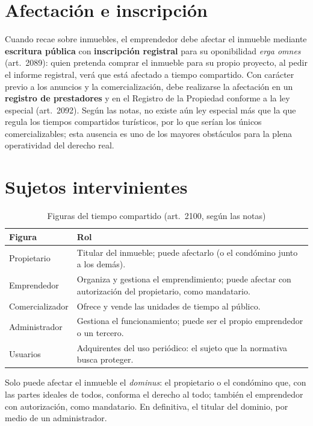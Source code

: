 \documentclass[12pt,oneside]{book}
\begin{document}
\section{Afectación e inscripción}

Cuando recae sobre inmuebles, el emprendedor debe afectar el inmueble mediante \textbf{escritura pública} con \textbf{inscripción registral} para su oponibilidad \textit{erga omnes} (art.~2089): quien pretenda comprar el inmueble para su propio proyecto, al pedir el informe registral, verá que está afectado a tiempo compartido. Con carácter previo a los anuncios y la comercialización, debe realizarse la afectación en un \textbf{registro de prestadores} y en el Registro de la Propiedad conforme a la ley especial (art.~2092). Según las notas, no existe aún ley especial más que la que regula los tiempos compartidos turísticos, por lo que serían los únicos comercializables; esta ausencia es uno de los mayores obstáculos para la plena operatividad del derecho real.

\section{Sujetos intervinientes}

\begin{table}[H]
\centering
\small
\begin{tabularx}{\textwidth}{>{\raggedright\arraybackslash}p{}>{\raggedright\arraybackslash}X}
\toprule
\textbf{Figura} & \textbf{Rol} \\
\midrule
Propietario & Titular del inmueble; puede afectarlo (o el condómino junto a los demás). \\
Emprendedor & Organiza y gestiona el emprendimiento; puede afectar con autorización del propietario, como mandatario. \\
Comercializador & Ofrece y vende las unidades de tiempo al público. \\
Administrador & Gestiona el funcionamiento; puede ser el propio emprendedor o un tercero. \\
Usuarios & Adquirentes del uso periódico: el sujeto que la normativa busca proteger. \\
\bottomrule
\end{tabularx}
\caption{Figuras del tiempo compartido (art.~2100, según las notas)}
\end{table}

Solo puede afectar el inmueble el \textit{dominus}: el propietario o el condómino que, con las partes ideales de todos, conforma el derecho al todo; también el emprendedor con autorización, como mandatario. En definitiva, el titular del dominio, por medio de un administrador.
\end{document}
